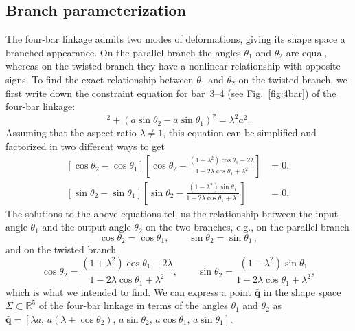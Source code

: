 \subsection{Branch parameterization}

The four-bar linkage admits two modes of deformations, giving its shape space a branched appearance.
On the parallel branch the angles $\theta_{1}$ and $\theta_{2}$ are equal, whereas on the twisted branch they have a nonlinear relationship with opposite signs.
To find the exact relationship between $\theta_{1}$ and $\theta_{2}$ on the twisted branch, we first write down the constraint equation for bar~3--4 (see Fig.~\ref{fig:4bar}) of the four-bar linkage:
%
\begin{equation}
  [\lambda a + a(\cos{\theta_2} - \cos{\theta_1})]^2 + (a\sin{\theta_2} - a\sin{\theta_1})^2 = \lambda^2 a^2.
\end{equation}
%
Assuming that the aspect ratio $\lambda \ne 1$, this equation can be simplified and factorized in two different ways to get
%
\begin{subequations}
\begin{align}
  \left[\cos{\theta_2} - \cos{\theta_1}\right]\left[\cos{\theta_2} - \frac{(1 + \lambda^2)\cos{\theta_1} - 2\lambda}{1 - 2\lambda\cos{\theta_1} + \lambda^2}\right] &= 0,\\
  \left[\sin{\theta_2} - \sin{\theta_1}\right]\left[\sin{\theta_2} - \frac{(1 - \lambda^2)\sin{\theta_1}}{1 -2\lambda\cos{\theta_1} + \lambda^2}\right] &= 0.
\end{align}
\end{subequations}
%
The solutions to the above equations tell us the relationship between the input angle $\theta_1$ and the output angle $\theta_2$ on the two branches, e.g., on the parallel branch
%
\begin{equation}
  \cos\theta_2 = \cos\theta_1,\qquad
  \sin\theta_2 = \sin\theta_1\,;
  \label{eq:parallel}
\end{equation}
%
and on the twisted branch
%
\begin{equation}
  \cos\theta_2 = \frac{(1 + \lambda^2)\cos{\theta_1} - 2\lambda}{1 - 2\lambda\cos{\theta_1} + \lambda^2}, \qquad
  \sin\theta_2 = \frac{(1 - \lambda^2)\sin{\theta_1}}{1 - 2\lambda\cos{\theta_1} + \lambda^2},
  \label{eq:twisted}
\end{equation}
%
which is what we intended to find.
We can express a point $\bar{\bm{q}}$ in the shape space $\Sigma \subset \mathbb{R}^5$ of the four-bar linkage in terms of the angles $\theta_1$ and $\theta_2$ as $\bar{\bm{q}} = [\lambda a,\, a(\lambda + \cos{\theta_2}),\, a\sin{\theta_2},\, a\cos{\theta_1},\, a\sin{\theta_1}]$.
